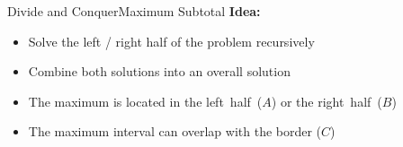 


\begin{frame}{Divide and Conquer}{Maximum Subtotal}
  \textbf{Idea:}
  \begin{figure}
    \begin{adjustbox}{width=\linewidth}
      
    \end{adjustbox}
    \label{fig:divide_and_conquer:max_sub_total_divide}
  \end{figure}
  \vspace{-1.5em}
  \begin{itemize}
    \item<2->
      Solve the left / right half of the problem {\color{MainA}recursively}
    \item<3->
      Combine both solutions into an overall solution
    \item<4->
      The maximum is located in the {\color{MainA}left~half~($A$)}
      or the {\color{MainA}right~half~($B$)}
    \item<5->
      The maximum interval can {\color{MainA} overlap with the border ($C$)}
  \end{itemize}
\end{frame}

